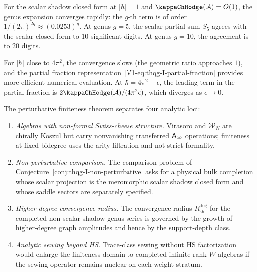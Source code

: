 \begin{remark}
For the scalar shadow closed form at $|\hbar| = 1$ and
$\kappaChHodge(\cA) = O(1)$,
the genus expansion converges rapidly: the $g$-th term is of order
$1/(2\pi)^{2g} \approx (0.0253)^g$. At genus $g = 5$, the scalar
partial sum $S_5$ agrees with the scalar closed form to $10$
significant digits. At genus $g = 10$, the agreement is to $20$
digits.

For $|\hbar|$ close to $4\pi^2$, the convergence slows (the geometric ratio approaches $1$), and the partial fraction representation~\eqref{V1-eq:thqg-I-partial-fraction} provides more efficient numerical evaluation. At $\hbar = 4\pi^2 - \epsilon$, the leading term in the partial fraction is $2\kappaChHodge(\cA)/(4\pi^2 \epsilon)$, which diverges as $\epsilon \to 0$.
\end{remark}

\begin{remark}
\label{rem:thqg-I-open-directions}
The perturbative finiteness theorem separates four analytic loci:
\begin{enumerate}[label=\textup{(\arabic*)}]
\item \emph{Algebras with non-formal Swiss-cheese structure.} Virasoro and $\mathcal{W}_N$ are chirally Koszul but carry nonvanishing transferred $\mathsf{A}_{\infty}$ operations; finiteness at fixed bidegree uses the arity filtration and not strict formality.
\item \emph{Non-perturbative comparison.} The comparison problem of Conjecture~\ref{conj:thqg-I-non-perturbative} asks for a physical bulk completion whose scalar projection is the meromorphic scalar shadow closed form and whose saddle sectors are separately specified.
\item \emph{Higher-degree convergence radius.} The convergence radius \(R_{\mathrm{sh}}^{\mathrm{deg}}\) for the completed non-scalar shadow genus series is governed by the growth of higher-degree graph amplitudes and hence by the support-depth class.
\item \emph{Analytic sewing beyond HS.} Trace-class sewing without HS factorization would enlarge the finiteness domain to completed infinite-rank $W$-algebras if the sewing operator remains nuclear on each weight stratum.
\end{enumerate}
\end{remark}

